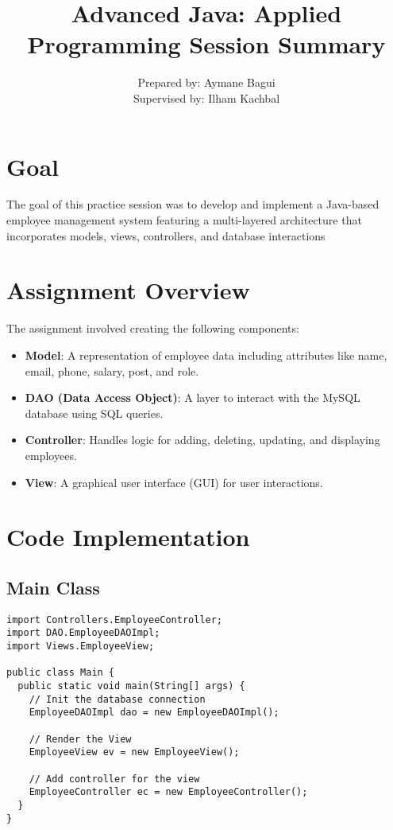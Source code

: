 \documentclass[12pt]{article}
\title{Advanced Java: Applied Programming Session Summary}
\author{Prepared by: Aymane Bagui \\ Supervised by:  Ilham Kachbal}
\begin{document}
\maketitle

\newpage
\tableofcontents
\newpage

\section{Goal}
The goal of this practice session was to develop and implement a Java-based employee management system featuring a multi-layered architecture that incorporates models, views, controllers, and database interactions

\section{Assignment Overview}
The assignment involved creating the following components:
\begin{itemize}
    \item \textbf{Model}: A representation of employee data including attributes like name, email, phone, salary, post, and role.
    \item \textbf{DAO (Data Access Object)}: A layer to interact with the MySQL database using SQL queries.
    \item \textbf{Controller}: Handles logic for adding, deleting, updating, and displaying employees.
    \item \textbf{View}: A graphical user interface (GUI) for user interactions.
\end{itemize}

\section{Code Implementation}

\subsection{Main Class}
\begin{lstlisting}
import Controllers.EmployeeController;
import DAO.EmployeeDAOImpl;
import Views.EmployeeView;

public class Main {
  public static void main(String[] args) {
    // Init the database connection
    EmployeeDAOImpl dao = new EmployeeDAOImpl();

    // Render the View
    EmployeeView ev = new EmployeeView();

    // Add controller for the view
    EmployeeController ec = new EmployeeController();
  }
}
\end{lstlisting}
\end{document}

